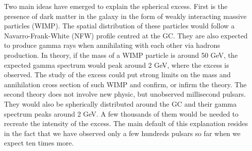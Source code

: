 Two main ideas have emerged to explain the spherical excess.
First is the presence of dark matter in the galaxy in the form of weakly interacting massive particles (WIMP). The spatial distribution of these particles would follow a Navarro-Frank-White (NFW) profile centred at the GC. They are also expected to produce gamma rays when annihilating with each other via hadrons production. In theory, if the mass of a WIMP particle is around 50 GeV, the expected gamma spectrum would peak around 2 GeV, where the excess is observed. 
The study of the excess could put strong limits on the mass and annihilation cross section of such WIMP and confirm, or infirm the theory.
The second theory does not involve new physic, but unobserved millisecond pulsars. They would also be spherically distributed around the GC and their gamma spectrum peaks around 2 GeV. A few thousands of them would be needed to recreate the intensity of the excess. The main default of this explanation resides in the fact that we have observed only a few hundreds pulsars so far when we expect ten times more.








































